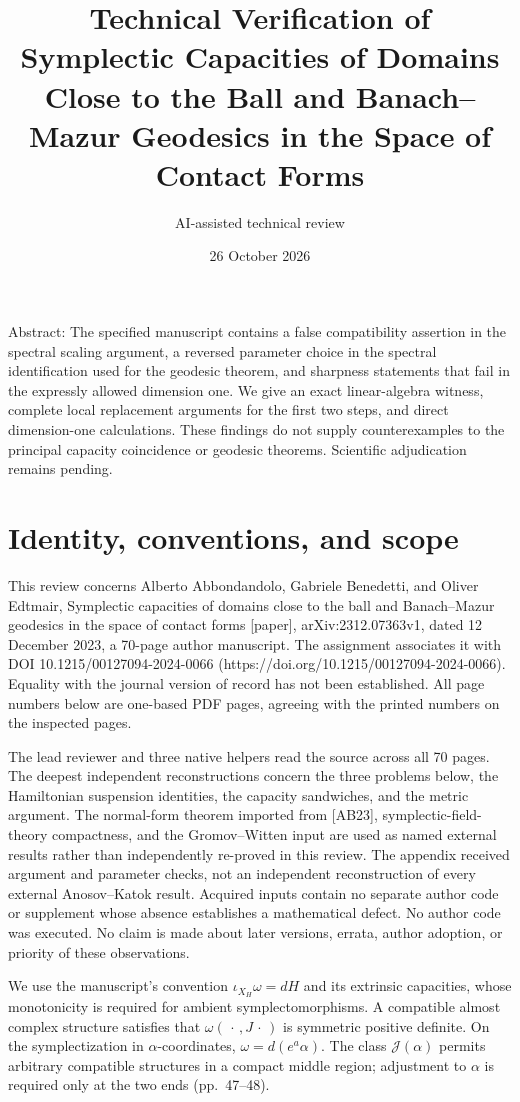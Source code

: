 \documentclass[10pt]{article}
\title{Technical Verification of
Symplectic Capacities of Domains Close to the Ball and
Banach–Mazur Geodesics in the Space of Contact Forms}
\author{AI-assisted technical review}
\date{26 October 2026}
\begin{document}
\maketitle
Abstract: The specified manuscript contains a false compatibility assertion in the spectral scaling argument, a reversed parameter choice in the spectral identification used for the geodesic theorem, and sharpness statements that fail in the expressly allowed dimension one. We give an exact linear-algebra witness, complete local replacement arguments for the first two steps, and direct dimension-one calculations. These findings do not supply counterexamples to the principal capacity coincidence or geodesic theorems. Scientific adjudication remains pending.\par
\section*{Identity, conventions, and scope}
This review concerns Alberto Abbondandolo, Gabriele Benedetti, and Oliver Edtmair, Symplectic capacities of domains close to the ball and Banach–Mazur geodesics in the space of contact forms [paper], arXiv:2312.07363v1, dated 12 December 2023, a 70-page author manuscript. The assignment associates it with DOI 10.1215/00127094-2024-0066 (https://doi.org/10.1215/00127094-2024-0066). Equality with the journal version of record has not been established. All page numbers below are one-based PDF pages, agreeing with the printed numbers on the inspected pages.\par
The lead reviewer and three native helpers read the source across all 70 pages. The deepest independent reconstructions concern the three problems below, the Hamiltonian suspension identities, the capacity sandwiches, and the metric argument. The normal-form theorem imported from [AB23], symplectic-field-theory compactness, and the Gromov–Witten input are used as named external results rather than independently re-proved in this review. The appendix received argument and parameter checks, not an independent reconstruction of every external Anosov–Katok result. Acquired inputs contain no separate author code or supplement whose absence establishes a mathematical defect. No author code was executed. No claim is made about later versions, errata, author adoption, or priority of these observations.\par
We use the manuscript’s convention \(\iota_{X_H}\omega=dH\) and its extrinsic capacities, whose monotonicity is required for ambient symplectomorphisms. A compatible almost complex structure satisfies that \(\omega(\,\cdot\,,J\,\cdot\,)\) is symmetric positive definite. On the symplectization in \(\alpha\)-coordinates, \(\omega=d(e^a\alpha)\). The class \(\mathcal J(\alpha)\) permits arbitrary compatible structures in a compact middle region; adjustment to \(\alpha\) is required only at the two ends (pp. 47–48).\par
\end{document}

